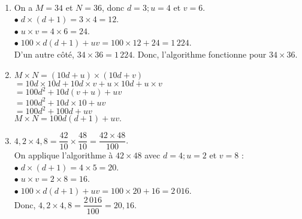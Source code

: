 \ \\ [-5mm]
   \begin{enumerate}
      \item On a $M =34$ et $N =36$, donc $d =3 ; u =4$ et $v =6$. \\
         $\bullet \; d\times(d+1) =3\times4 =12$. \\
         $\bullet \; u\times v =4\times6 =24$. \\
         $\bullet \; 100\times d(d+1)+uv =100\times12+24 =1\,224$. \\
         D'un autre côté, $34\times36 =1\,224$. Donc, {\blue l'algorithme fonctionne pour $34\times36$}.
      \item $M\times N =(10d+u)\times(10d+v)$ \\
         \hspace*{1.47cm} $=10d\times10d+10d\times v+u\times10d+u\times v$ \\
         \hspace*{1.47cm} $=100d^2+10d(v+u)+uv$ \\
         \hspace*{1.47cm} $=100d^2+10d\times10+uv$ \\
         \hspace*{1.47cm} $=100d^2+100d+uv$ \\
         \hspace*{0.36cm} {\blue $M\times N =100d(d+1)+uv.$} \smallskip
      \item $4,2\times4,8 =\dfrac{42}{10}\times\dfrac{48}{10} =\dfrac{42\times48}{100}$. \\ [1mm]
         On applique l'algorithme à $42\times48$ avec $d =4 ; u =2$ et $v =8$ : \\
         $\bullet \; d\times(d+1) =4\times5 =20$. \\
         $\bullet \; u\times v =2\times8 =16$. \\
         $\bullet \; 100\times d(d+1)+uv =100\times20+16 =2\,016$. \\ [1mm]
         Donc, {\blue $4,2\times4,8 =\dfrac{2\,016}{100} =20,16$}.
      \end{enumerate}
